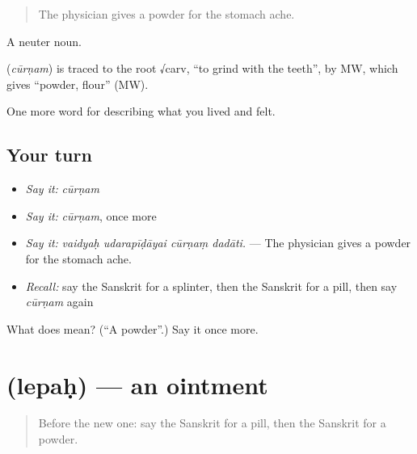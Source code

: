 \begin{quote}
The physician gives a powder for the stomach ache.
\end{quote}

A neuter noun.

\begin{cousinweb}
\textbf{} (\emph{cūrṇam}) is traced to the root √carv, \textquotedblleft{}to grind with the teeth\textquotedblright{}, by MW, which gives \textquotedblleft{}powder, flour\textquotedblright{} (MW).
\end{cousinweb}

\begin{grammarlens}[title={What you've built}]
One more word for describing what you lived and felt.
\end{grammarlens}

\subsection*{Your turn}
\begin{itemize}
\raggedright
  \item \emph{Say it:} \emph{cūrṇam}
  \item \emph{Say it:} \emph{cūrṇam}, once more
  \item \emph{Say it:} \emph{vaidyaḥ udarapīḍāyai cūrṇaṃ dadāti.} — The physician gives a powder for the stomach ache.
  \item \emph{Recall:} say the Sanskrit for a splinter, then the Sanskrit for a pill, then say \emph{cūrṇam} again
\end{itemize}

\begin{tcolorbox}[breakable,colback=teal!4,colframe=teal!35!black,title={Before you move on}]
What does  mean? (\textquotedblleft{}A powder\textquotedblright{}.) Say it once more.
\end{tcolorbox}
\section[\texorpdfstring{\sk{लेपः} (lepaḥ)}{लेपः (lepaḥ)}]{ (lepaḥ) — an ointment}

\label{lesson:SA-C483-lepah}



\begin{quote}
Before the new one: say the Sanskrit for a pill, then the Sanskrit for a powder.
\end{quote}

